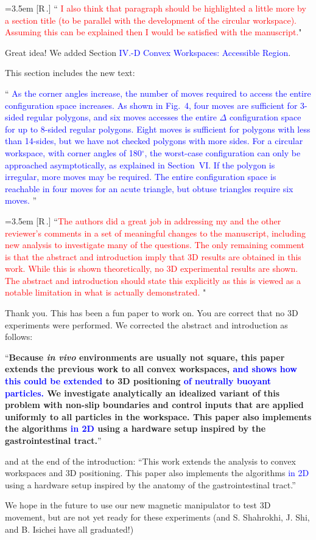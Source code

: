 \documentclass[conference, onecolumn, 10pt]{../IEEEtran}
\newcounter{reviewer}
\newcounter{point}[reviewer]
\newcommand{\revision}[1]{\textcolor{blue}{#1}}
\renewcommand{\thepoint}{[R\,\thereviewer.\arabic{point}] }
\newcommand{\response}[1]{\refstepcounter{point}  \smallbreak \noindent
	\hangindent=3.5em
	\hangafter=1
	\thepoint \space ``\textcolor{red}{#1}" \par\smallskip}
\begin{document}
	\response{ I also think that paragraph should be highlighted a little more by a section title (to be parallel with the development of the circular workspace).  Assuming this can be explained then I would be satisfied with the manuscript.}
	Great idea! We added Section 
	\revision{IV.-D Convex Workspaces: Accessible Region}.
	
	This section includes the new text:
	
	``\revision{
As the corner angles increase, the number of moves required to access the entire configuration space increases.  
As shown in Fig.~4,  four moves are sufficient for 3-sided regular polygons, and six moves accesses the entire $\Delta$ configuration space for up to 8-sided regular polygons.  Eight moves is sufficient for polygons with less than 14-sides, but we have not checked polygons with more sides. For a circular workspace, with corner angles of 180$^\circ$, the worst-case configuration can only be approached asymptotically, as explained in Section~VI.
If the polygon is irregular, more moves may be required.  The entire configuration space is reachable in four moves for an acute triangle, but obtuse triangles require six moves.
}''

	
	
	\response{The authors did a great job in addressing my and the other reviewer's comments in a set of meaningful changes to the manuscript, including new analysis to investigate many of the questions. 
The only remaining comment is that the abstract and introduction imply that 3D results are obtained in this work. While this is shown theoretically, no 3D experimental results are shown. The abstract and introduction should state this explicitly as this is viewed as a notable limitation in what is actually demonstrated.
}
	Thank you. This has been a fun paper to work on. 
	 You are correct that no 3D experiments were performed.  
	 We corrected the abstract and introduction as follows:
	 
	``{\bf Because \emph{in vivo} environments are usually not square, this paper extends the previous work to all convex workspaces, \revision{ and shows how this could be extended} to 3D positioning \revision{of neutrally buoyant particles.} 
We investigate analytically an idealized variant of this problem with non-slip boundaries and control inputs that are applied uniformly to all particles in the workspace.
This paper also implements the algorithms \revision{in 2D} using a hardware setup inspired by the gastrointestinal tract.}''

and at the end of the introduction:
``This work extends the analysis to convex workspaces and 3D positioning. This paper also implements the algorithms \revision{in 2D} using a hardware setup inspired by the anatomy of the gastrointestinal tract.''

	 
	 We hope in the future to use our new magnetic manipulator to test 3D movement, but are not yet ready for these experiments (and S. Shahrokhi, J. Shi, and B. Isichei have all graduated!)
		
		
\end{document}
